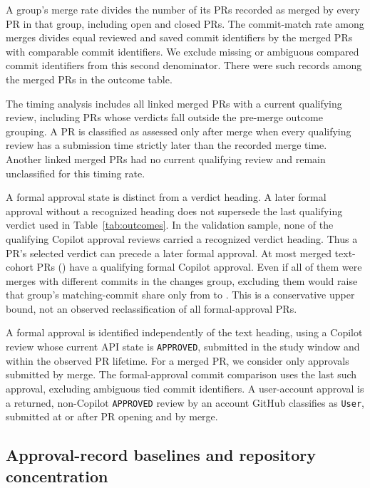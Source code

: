 \documentclass[11pt,letterpaper]{article}
\begin{document}
A group's merge rate divides the number of its PRs recorded as merged
by every PR in that group, including open and closed PRs. The commit-match
rate among merges divides equal reviewed and saved commit identifiers by the merged
PRs with comparable commit identifiers. We exclude missing or ambiguous compared commit identifiers
from this second denominator. There were \UnknownComparedSHAs{} such records among the
\OutcomeMerged{} merged PRs in the outcome table.

The timing analysis includes all \PostMergeDenominator{} linked merged PRs with a current
qualifying review, including PRs whose verdicts fall outside the
pre-merge outcome grouping. A PR is classified as assessed only after
merge when every qualifying review has a submission time strictly later
than the recorded merge time. Another \NoCurrentMergedReview{} linked merged PRs had no current
qualifying review and remain unclassified for this timing rate.

A formal approval state is distinct from a verdict heading. A later
formal approval without a recognized heading does not supersede the last
qualifying verdict used in Table~\ref{tab:outcomes}. In the
validation sample, none of the \SampleFormalReviews{} qualifying Copilot
approval reviews carried a recognized verdict heading. Thus a PR's
selected verdict can precede a later formal approval. At most
\FormalMerged{} merged text-cohort PRs (\FormalShareOfMergedText{}) have
a qualifying formal Copilot approval. Even if all of them were
merges with different commits in the changes group, excluding them would raise
that group's matching-commit share only from \ChangesMatchRate{} to
\ChangesFormalBoundRate{}. This is a conservative upper bound, not an
observed reclassification of all formal-approval PRs.

A formal approval is identified independently of the text heading,
using a Copilot review whose current API state is \texttt{APPROVED},
submitted in the study window and within the observed PR lifetime.
For a merged PR, we consider only approvals submitted by merge. The
formal-approval commit comparison uses the last such approval, excluding
ambiguous tied commit identifiers. A user-account approval is a returned, non-Copilot
\texttt{APPROVED} review by an account GitHub classifies as \texttt{User},
submitted at or after PR opening and by merge.

\subsection{Approval-record baselines and repository concentration}
\end{document}

